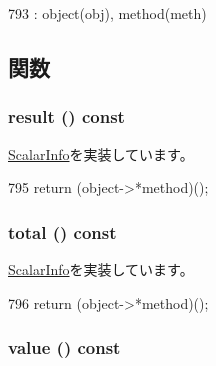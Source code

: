 \begin{DoxyCode}
793 : object(obj), method(meth) {}
\end{DoxyCode}


\subsection{関数}
\hypertarget{classStats_1_1MethodProxy_ae050da86c3d8e8a677a0bdeb7971e1e3}{
\subsubsection[{result}]{ result () const}}
\label{classStats_1_1MethodProxy_ae050da86c3d8e8a677a0bdeb7971e1e3}


\hyperlink{classStats_1_1ScalarInfo_a8c2a750792392eea5225b05b9ec4bead}{ScalarInfo}を実装しています。


\begin{DoxyCode}
795 { return (object->*method)(); }
\end{DoxyCode}
\hypertarget{classStats_1_1MethodProxy_a35c6e2ed3fc81b40d69052a062113ead}{
\subsubsection[{total}]{ total () const}}
\label{classStats_1_1MethodProxy_a35c6e2ed3fc81b40d69052a062113ead}


\hyperlink{classStats_1_1ScalarInfo_ab152b7e89b37a7db03b04d500ceb8349}{ScalarInfo}を実装しています。


\begin{DoxyCode}
796 { return (object->*method)(); }
\end{DoxyCode}
\hypertarget{classStats_1_1MethodProxy_aa9e486cb7eb0ad44f5f89923594b68a4}{
\subsubsection[{value}]{ value () const}}
\label{classStats_1_1MethodProxy_aa9e486cb7eb0ad44f5f89923594b68a4}


